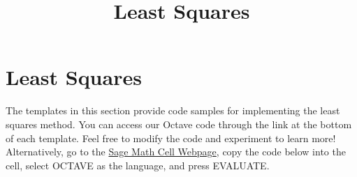 \documentclass{ximera}
\title{Least Squares} \license{CC BY-NC-SA 4.0}
\begin{document}
\begin{abstract}
\end{abstract}
\maketitle
\section*{Least Squares}

The templates in this section provide code samples for implementing the least squares method. You can access our Octave code through the link at the bottom of each template.  Feel free to modify the code and experiment to learn more!  Alternatively, go to the \href{https://sagecell.sagemath.org/}{Sage Math Cell Webpage}, copy the code below into the cell, select OCTAVE as the language, and press EVALUATE.  

\end{document}
